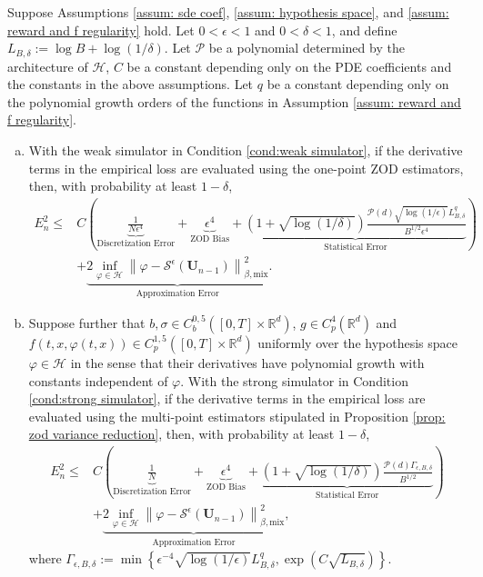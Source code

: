 \documentclass[twoside,11pt]{article}
\newcommand{\R}{\mathbb{R}}
\newcommand{\1}{\mathbf{1}}
\numberwithin{equation}{section}
\newcommand{\normmix}[1]{\left\|#1\right\|_{\beta, \text{mix}}}
\begin{document}
\begin{theorem}\label{thm: one step error bound}
Suppose Assumptions \ref{assum: sde coef}, \ref{assum: hypothesis space}, and \ref{assum: reward and f regularity} hold. Let $0<\epsilon<1$ and $0<\delta<1$, and define $L_{B,\delta}:=\log B+\log(1/\delta)$. Let $\mathcal P$ be a polynomial determined by the architecture of $\mathcal H$, $C$ be a constant depending only on the PDE coefficients and the constants in the above assumptions. Let \(q\) be a constant depending only on the
polynomial growth orders of the functions in Assumption \ref{assum: reward and f regularity}.
 \begin{enumerate}[(a)]
\item With the weak simulator in Condition \ref{cond:weak simulator}, if the derivative terms in the empirical loss are evaluated using the one-point ZOD estimators, then, with probability at least $1-\delta$,
    \begin{equation}
        \begin{aligned}
        E_n^2 \le& C\left( \underbrace{\frac{1}{N\epsilon^{4}}}_{\text{Discretization Error}} + \underbrace{\epsilon^{4}}_{\text{ZOD Bias}}
        + \underbrace{\left(1+\sqrt{\log(1/\delta)}\right)
        \frac{\mathcal P(d)\sqrt{\log(1/\epsilon)}L_{B,\delta}^{q}}
        {B^{1/2}\epsilon^4}}_{\text{Statistical Error}}\right) \\
        &+ \underbrace{2 \inf_{\varphi\in \mathcal{H}} \normmix{\varphi - \mathcal{S}^\epsilon(\mathbf{U}_{n-1})}^2}_{\text{Approximation Error}}.
        \end{aligned}
    \end{equation}
\item Suppose further that $b,\sigma \in C^{0,5}_b([0,T]\times\R^d)$, $g\in C^{4}_p(\R^d)$ and $f(t,x,\varphi(t,x)) \in C^{1,5}_p([0,T]\times\R^d)$ uniformly over the hypothesis space $ \varphi\in \mathcal{H}$ in the sense that their derivatives have polynomial growth with constants independent of $\varphi$. With the strong simulator in Condition \ref{cond:strong simulator}, if the derivative terms in the empirical loss are evaluated using the multi-point estimators stipulated in Proposition \ref{prop: zod variance reduction}, then, with probability at least $1-\delta$,
       \begin{equation}
        \begin{aligned}
        E_n^2 \le& C\left( \underbrace{\frac{1}{N}}_{\text{Discretization Error}} + \underbrace{\epsilon^{4}}_{\text{ZOD Bias}}
        + \underbrace{\left(1+\sqrt{\log(1/\delta)}\right)
        \frac{\mathcal P(d)\Gamma_{\epsilon,B,\delta}}{B^{1/2}}}_{\text{Statistical Error}}\right)\\
        &+ \underbrace{2 \inf_{\varphi\in \mathcal{H}} \normmix{\varphi - \mathcal{S}^\epsilon(\mathbf{U}_{n-1})}^2}_{\text{Approximation Error}},
        \end{aligned}
    \end{equation}
    where
$\Gamma_{\epsilon,B,\delta}
        :=
        \min\left\{
        \epsilon^{-4}\sqrt{\log(1/\epsilon)}L_{B,\delta}^{q},
        \exp\!\left(C\sqrt{L_{B,\delta}}\right)
        \right\}$.
    
    \end{enumerate}
\end{theorem}
\end{document}
